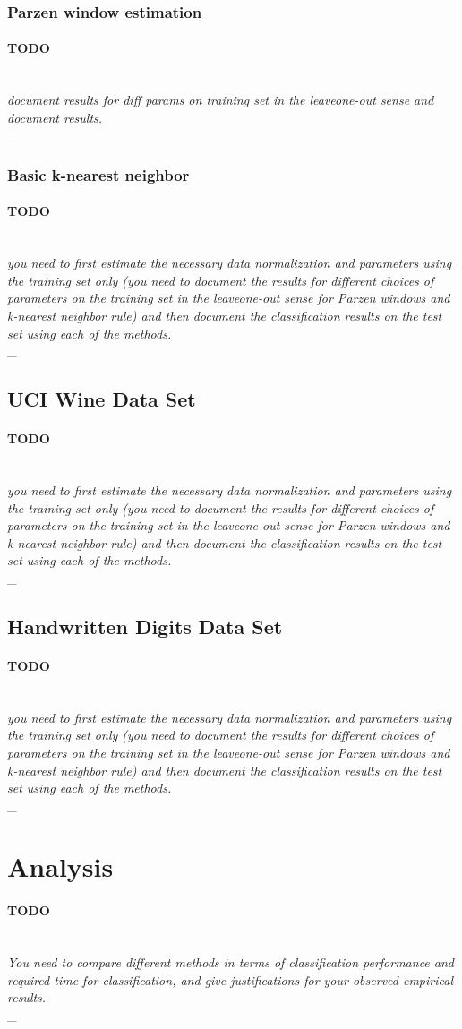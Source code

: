 \documentclass{article}
\newcommand{\outline}[2]{\paragraph{\textsc{#1}}\hrulefill~\\{\small\it #2}\\\_\hrulefill~\\}
\newcommand{\todo}[1]{\outline{\large TODO}{#1}}
\begin{document}
\subsubsection{Parzen window estimation}
\todo{document results for diff params on training set in the leaveone-out sense and document results.}

\subsubsection{Basic k-nearest neighbor}
\todo{you need to first estimate the necessary data normalization and parameters using the training set only (you need to document the results for different choices of parameters on the training set in the leaveone-out sense for Parzen windows and k-nearest neighbor rule) and then document the classification results on
the test set using each of the methods.}

\subsection{UCI Wine Data Set}
\todo{you need to first estimate the necessary data normalization and parameters using the training set only (you need to document the results for different choices of parameters on the training set in the leaveone-out sense for Parzen windows and k-nearest neighbor rule) and then document the classification results on
the test set using each of the methods.}

\subsection{Handwritten Digits Data Set}
\todo{you need to first estimate the necessary data normalization and parameters using the training set only (you need to document the results for different choices of parameters on the training set in the leaveone-out sense for Parzen windows and k-nearest neighbor rule) and then document the classification results on
the test set using each of the methods.}

\section{Analysis}
\todo{You need to compare different methods in terms of classification performance and required time for classification, and give justifications for your observed empirical results.}
\end{document}
